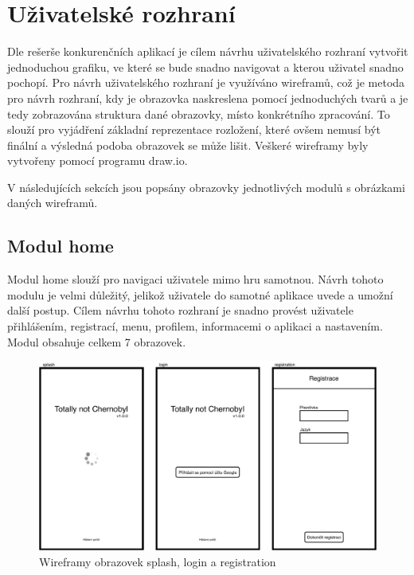 \section{Uživatelské rozhraní}

Dle rešerše konkurenčních aplikací je cílem návrhu uživatelského rozhraní
vytvořit jednoduchou grafiku,
ve které se bude snadno navigovat a kterou uživatel snadno pochopí.
Pro návrh uživatelského rozhraní je využíváno wireframů,
což je metoda pro návrh rozhraní,
kdy je obrazovka naskreslena pomocí jednoduchých tvarů
a je tedy zobrazována struktura dané obrazovky,
místo konkrétního zpracování.
To slouží pro vyjádření základní reprezentace rozložení,
které ovšem nemusí být finální a výsledná podoba obrazovek se může lišit. 
Veškeré wireframy byly vytvořeny pomocí programu draw.io.

V následujících sekcích jsou popsány obrazovky jednotlivých modulů
s obrázkami daných wireframů.

\subsection{Modul home}

Modul home slouží pro navigaci uživatele mimo hru samotnou.
Návrh tohoto modulu je velmi důležitý,
jelikož uživatele do samotné aplikace uvede a umožní další postup.
Cílem návrhu tohoto rozhraní je snadno provést uživatele přihlášením,
registrací, menu, profilem, informacemi o aplikaci a nastavením.
Modul obsahuje celkem 7 obrazovek.

\begin{figure}
    \centering
    \includegraphics[width=1\linewidth]{assets/design/wireframes/home-1.pdf}
    \caption{Wireframy obrazovek splash, login a registration}
    \label{fig:ui-home-1}
\end{figure}

